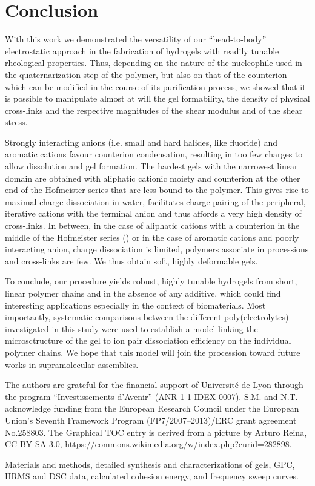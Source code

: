 \documentclass[journal=jacsat,manuscript=article]{achemso}
\begin{document}
\section{Conclusion}
With this work we demonstrated the versatility of our ``head-to-body'' electrostatic approach in the fabrication of hydrogels with readily tunable rheological properties. Thus, depending on the nature of the nucleophile used in the quaternarization step of the polymer, but also on that of the counterion which can be modified in the course of its purification process, we showed that it is possible to manipulate almost at will the gel formability, the density of physical cross-links and the respective magnitudes of the shear modulus and of the shear stress. 

Strongly interacting anions (i.e. small and hard halides, like fluoride) and aromatic cations favour counterion condensation, resulting in too few charges to allow dissolution and gel formation. The hardest gels with the narrowest linear domain are obtained with aliphatic cationic moiety and counterion at the other end of the Hofmeister series that are less bound to the polymer. This gives rise to maximal charge dissociation in water, facilitates charge pairing of the peripheral, iterative cations with the terminal anion and thus affords a very high density of cross-links. In between, in the case of aliphatic cations with a counterion in the middle of the Hofmeister series () or in the case of aromatic cations and poorly interacting anion, charge dissociation is limited, polymers associate in processions and cross-links are few. We thus obtain soft, highly deformable gels.

To conclude, our procedure yields robust, highly tunable hydrogels from short, linear polymer chains and in the absence of any additive, which could find interesting applications especially in the context of biomaterials. Most importantly, systematic comparisons between the different poly(electrolytes) investigated in this study were used to establish a model linking the microsctructure of the gel to ion pair dissociation efficiency on the individual polymer chains. We hope that this model will join the procession toward future works in supramolecular assemblies.

\begin{acknowledgement}
The authors are grateful for the financial support of Université de Lyon through the program ``Investissements d'Avenir'' (ANR-1 1-IDEX-0007). S.M. and N.T. acknowledge funding from the European Research Council under the European Union's Seventh Framework Program (FP7/2007–2013)/ERC grant agreement No.258803. The Graphical TOC entry is derived from a picture by Arturo Reina, CC BY-SA 3.0, \url{https://commons.wikimedia.org/w/index.php?curid=282898}.
\end{acknowledgement}

\begin{suppinfo}

Materials and methods, detailed synthesis and characterizations of gels, GPC, HRMS and DSC data, calculated cohesion energy, and frequency sweep curves.

\end{suppinfo}


\end{document}

